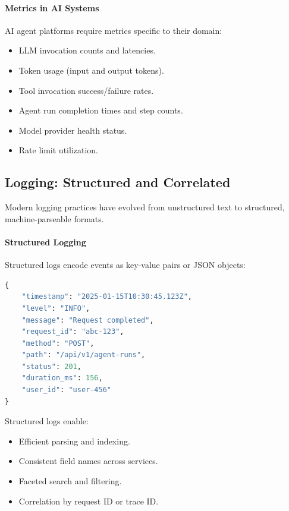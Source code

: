\documentclass[a4paper,twoside]{sapthesis}
\begin{document}
\paragraph{Metrics in AI Systems}

AI agent platforms require metrics specific to their domain:
\begin{itemize}
    \item LLM invocation counts and latencies.
    \item Token usage (input and output tokens).
    \item Tool invocation success/failure rates.
    \item Agent run completion times and step counts.
    \item Model provider health status.
    \item Rate limit utilization.
\end{itemize}

\subsection{Logging: Structured and Correlated}

Modern logging practices have evolved from unstructured text to structured, machine-parseable formats.

\paragraph{Structured Logging}

Structured logs encode events as key-value pairs or JSON objects:

\begin{lstlisting}[language=Python,caption={Structured log example}]
{
    "timestamp": "2025-01-15T10:30:45.123Z",
    "level": "INFO",
    "message": "Request completed",
    "request_id": "abc-123",
    "method": "POST",
    "path": "/api/v1/agent-runs",
    "status": 201,
    "duration_ms": 156,
    "user_id": "user-456"
}
\end{lstlisting}

Structured logs enable:
\begin{itemize}
    \item Efficient parsing and indexing.
    \item Consistent field names across services.
    \item Faceted search and filtering.
    \item Correlation by request ID or trace ID.
\end{itemize}
\end{document}

